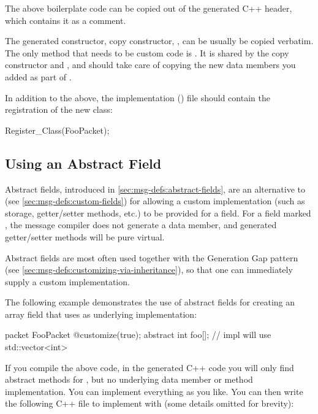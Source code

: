 \begin{note}
  The above boilerplate code can be copied out of the generated C++ header, which
  contains it as a comment.
\end{note}

The generated constructor, copy constructor, ,  can be
usually be copied verbatim. The only method that needs to be custom code is
. It is shared by the copy constructor and , and
should take care of copying the new data members you added as part of
.

In addition to the above, the implementation () file should contain the
registration of the new class:

\begin{cpp}
Register_Class(FooPacket);
\end{cpp}


\subsection{Using an Abstract Field}
\label{sec:msg-defs:customizing-via-abstact-field}

Abstract fields, introduced in \ref{sec:msg-defs:abstract-fields}, are an
alternative to  (see \ref{sec:msg-defs:custom-fields}) for
allowing a custom implementation (such as storage, getter/setter methods, etc.)
to be provided for a field. For a field marked , the message compiler does
not generate a data member, and generated getter/setter methods will be pure
virtual.

Abstract fields are most often used together with the Generation Gap pattern
(see \ref{sec:msg-defs:customizing-via-inheritance}), so that one can
immediately supply a custom implementation.

The following example demonstrates the use of abstract fields for creating
an array field that uses  as underlying implementation:

\begin{msg}
packet FooPacket
{
    @customize(true);
    abstract int foo[]; // impl will use std::vector<int>
}
\end{msg}

If you compile the above code, in the generated C++ code you will only find
abstract methods for , but no underlying data member or method
implementation. You can implement everything as you like. You can then write the
following C++ file to implement  with  (some
details omitted for brevity):

